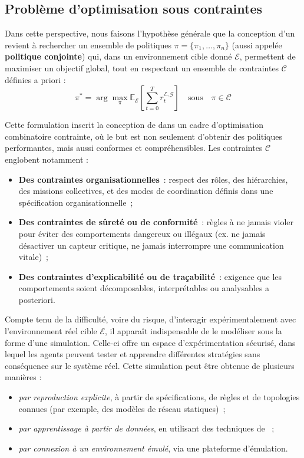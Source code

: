 \subsection{Problème d'optimisation sous contraintes}

Dans cette perspective, nous faisons l'hypothèse générale que la conception d'un  revient à rechercher un ensemble de politiques $\pi = \{\pi_1, \dots, \pi_n\}$ (aussi appelée \textbf{politique conjointe}) qui, dans un environnement cible donné $\mathcal{E}$, permettent de maximiser un objectif global, tout en respectant un ensemble de contraintes $\mathcal{C}$ définies a priori :
%
\begin{equation*}
  \pi^* = \arg\max_{\pi} \mathbb{E}_{\mathcal{E}} \left[ \sum_{t=0}^{T} r^{\mathcal{E}, \mathcal{G}}_t \right] \quad \text{sous} \quad \pi \in \mathcal{C}
\end{equation*}

\noindent
Cette formulation inscrit la conception de  dans un cadre d'optimisation combinatoire contrainte, où le but est non seulement d'obtenir des politiques performantes, mais aussi conformes et compréhensibles.
%
Les contraintes $\mathcal{C}$ englobent notamment :
\begin{itemize}
  \item \textbf{Des contraintes organisationnelles}~: respect des rôles, des hiérarchies, des missions collectives, et des modes de coordination définis dans une spécification organisationnelle~;
  \item \textbf{Des contraintes de sûreté ou de conformité}~: règles à ne jamais violer pour éviter des comportements dangereux ou illégaux (ex. ne jamais désactiver un capteur critique, ne jamais interrompre une communication vitale)~;
  \item \textbf{Des contraintes d'explicabilité ou de traçabilité}~: exigence que les comportements soient décomposables, interprétables ou analysables a posteriori.
\end{itemize}

Compte tenu de la difficulté, voire du risque, d'interagir expérimentalement avec l'environnement réel cible $\mathcal{E}$, il apparaît indispensable de le modéliser sous la forme d'une simulation. Celle-ci offre un espace d'expérimentation sécurisé, dans lequel les agents peuvent tester et apprendre différentes stratégies sans conséquence sur le système réel. Cette simulation peut être obtenue de plusieurs manières :
\begin{itemize}
  \item \emph{par reproduction explicite}, à partir de spécifications, de règles et de topologies connues (par exemple, des modèles de réseau statiques)~;
  \item \emph{par apprentissage à partir de données}, en utilisant des techniques de ~;
  \item \emph{par connexion à un environnement émulé}, via une plateforme d'émulation.
\end{itemize}

